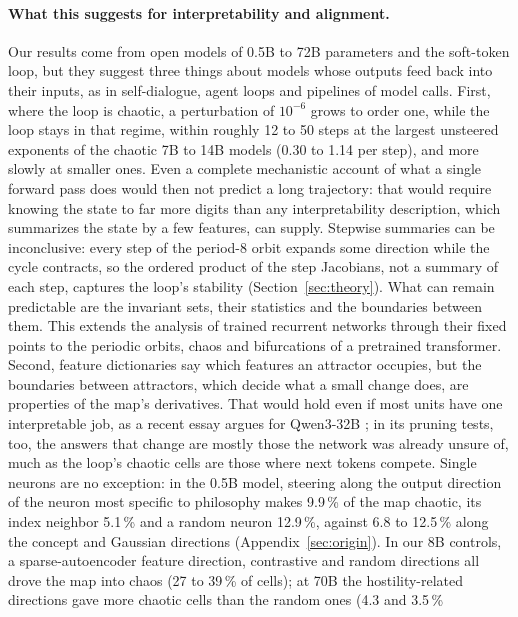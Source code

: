 \documentclass[11pt,letterpaper]{article}
\begin{document}
\paragraph{What this suggests for interpretability and alignment.} Our results come from open models of 0.5B to
72B parameters and the soft-token loop, but they suggest three things about models whose outputs feed back into their inputs, as in
self-dialogue, agent loops and pipelines of model calls. First, where the loop is chaotic, a perturbation of
$10^{-6}$ grows to order one, while the loop stays in that regime, within roughly 12 to 50 steps at the largest
unsteered exponents of the chaotic 7B to 14B models (0.30 to 1.14 per step), and more slowly at smaller ones. Even a complete mechanistic account of what a single forward pass does would then not predict a long trajectory:
that would require knowing the state to far more digits than any interpretability description, which summarizes the
state by a few features, can supply. Stepwise summaries can be
inconclusive: every step of the period-8 orbit expands some direction while the cycle contracts, so the ordered
product of the step Jacobians, not a summary of each step, captures the loop's stability
(Section~\ref{sec:theory}). What can remain predictable are the invariant sets, their
statistics and the boundaries between them. This extends the analysis of trained recurrent networks through their
fixed points \cite{sussillo2013opening,maheswaranathan2019reverse} to the periodic orbits, chaos and bifurcations of a
pretrained transformer. Second, feature dictionaries say which features an attractor occupies, but the boundaries
between attractors, which decide what a small change does, are properties of the map's derivatives. That would hold even if most units have one interpretable job, as a recent
essay argues for Qwen3-32B \cite{cammarata_clean}; in its pruning tests, too, the answers that change are mostly
those the network was already unsure of, much as the loop's chaotic cells are those where next tokens compete. Single neurons are no exception: in the 0.5B model, steering
along the output direction of the neuron most specific to philosophy makes 9.9\,\% of the map chaotic, its index
neighbor 5.1\,\% and a random neuron 12.9\,\%, against 6.8 to 12.5\,\% along the concept and Gaussian directions
(Appendix~\ref{sec:origin}). In our 8B controls,
a sparse-autoencoder feature direction, contrastive and random directions all drove the map into chaos (27 to 39\,\%
of cells); at 70B the hostility-related directions gave more chaotic cells than the random ones (4.3 and 3.5\,\%
\end{document}
